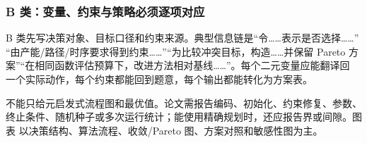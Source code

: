 \subsubsection{B 类：变量、约束与策略必须逐项对应}

B 类先写决策对象、目标口径和约束来源。典型信息链是“令……表示是否选择……”
“由产能/路径/时序要求得到约束……”“为比较冲突目标，构造……并保留 Pareto
方案”“在相同函数评估预算下，改进方法相对基线……”。每个二元变量应能翻译回
一个实际动作，每个约束都能回到题意，每个输出都能转化为方案表。

不能只给元启发式流程图和最优值。论文需报告编码、初始化、约束修复、参数、
终止条件、随机种子或多次运行统计；能使用精确规划时，还应报告界或间隙。图表
以决策结构、算法流程、收敛/Pareto 图、方案对照和敏感性图为主。

